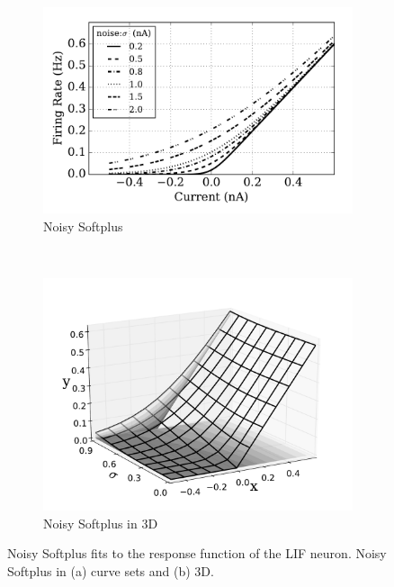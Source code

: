 	\begin{figure}[htb!]
		\centering
		\begin{subfigure}[t]{0.6\textwidth}
			\includegraphics[width=\textwidth]{pics_iconip/4.pdf}
			\caption{Noisy Softplus}
			\label{Fig:nsp}
		\end{subfigure}\\
		\begin{subfigure}[t]{0.6\textwidth}
			\includegraphics[width=\textwidth]{pics_iconip/5.pdf}
			\caption{Noisy Softplus in 3D}
			\label{Fig:3d}
		\end{subfigure}
		\caption{
			Noisy Softplus fits to the response function of the LIF neuron.
			Noisy Softplus in (a) curve sets and (b) 3D.}
		\label{fig:nsp}
	\end{figure}	
	
